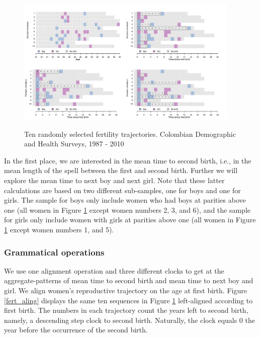 \documentclass{article}
\begin{document}
\begin{figure}[H]
\centering
    \includegraphics[trim=0cm 10cm 18cm 1cm, clip, width=0.95\textwidth]{Spells/Figures/colombia/illu_fertility.pdf}\\
    \caption{Ten randomly selected fertility trajectories. Colombian Demographic and Health Surveys, 1987 - 2010}
    \label{fert_illu}
\end{figure}

In the first place, we are interested in the mean time to second birth, i.e., in the mean length of the spell between the first and second birth. Further we will explore the mean time to next boy and next girl. Note that these latter calculations are based on two different sub-samples, one for boys and one for girls. The sample for boys only include women who had boys at parities above one (all women in Figure \ref{fert_illu} except women numbers 2, 3, and 6), and the sample for girls only include women with girls at parities above one (all women in Figure \ref{fert_illu} except women numbers 1, and 5). %


\subsubsection{Grammatical operations}

We use one alignment operation and three different clocks to get at the aggregate-patterns of mean time to second birth and mean time to next boy and girl. We align women's reproductive trajectory on the age at first birth. Figure \ref{fert_aling} displays the same ten sequences in Figure \ref{fert_illu} left-aligned according to first birth. The numbers in each trajectory count the years left to second birth, namely, a descending step clock to second birth. Naturally, the clock equals 0 the year before the occurrence of the second birth.\\
\end{document}

